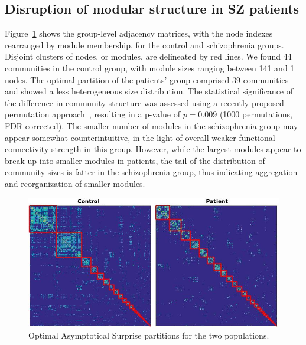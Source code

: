 \subsection{Disruption of modular structure in SZ patients}
Figure~\ref{fig:schizo_control_patients} shows the group-level adjacency matrices, with the node indexes rearranged by module membership, for the control and schizophrenia groups.
Disjoint clusters of nodes, or modules, are delineated by red lines.
We found 44 communities in the control group, with module sizes ranging between 141 and 1 nodes.
The optimal partition of the patients' group comprised 39 communities and showed a less heterogeneous size distribution.
The statistical significance of the difference in community structure was assessed using a recently proposed permutation approach~\cite{alexander-bloch2012}, resulting in a p-value of $p=0.009$ (1000 permutations, FDR corrected).
The smaller number of modules in the schizophrenia group may appear somewhat counterintuitive, in the light of overall weaker functional connectivity strength in this group.
However, while the largest modules appear to break up into smaller modules in patients, the tail of the distribution of community sizes is fatter in the schizophrenia group, thus indicating aggregation and reorganization of smaller modules.
\begin{figure}[!htb]
\centering
\includegraphics[width=\textwidth]{images/schizo/schizo_fig_3.jpg}
\caption{Optimal Asymptotical Surprise partitions for the two populations.}
\label{fig:schizo_control_patients}
\end{figure}


